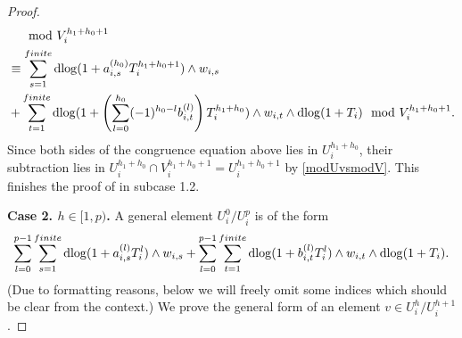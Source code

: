 \documentclass[11pt]{amsart}
\newcommand{\eq}[2]{\begin{equation}\label{#1}#2 \end{equation}}
\newcommand{\dlog}{\operatorname{dlog}}
\theoremstyle{plain}
\theoremstyle{definition}
\numberwithin{equation}{prop}
\begin{document}
\begin{proof}
\begin{align*}
&\quad
\mod V_i^{h_1+h_0+1}
\\
&\equiv 
\sum_{s=1}^{\rm finite}
\dlog(1+a^{(h_0)}_{i,s}T_i^{h_1+h_0+1})\wedge w_{i,s}
\\
&+\sum_{t=1}^{\rm finite}
\dlog(1+
\left(\sum_{l=0}^{h_0} (-1)^{h_0-l}b_{i,t}^{(l)}\right)
T_i^{h_1+h_0})\wedge w_{i,t}\wedge \dlog (1+T_i)
\mod V_i^{h_1+h_0+1}.
\end{align*}
Since both sides of the congruence equation above lies in $U_i^{h_1+h_0}$, their subtraction lies in $U_i^{h_1+h_0}\cap V_i^{h_1+h_0+1}=U_i^{h_1+h_0+1}$ by \eqref{modUvsmodV}.
This finishes the proof of  in subcase 1.2.





\textbf{Case 2. $h\in [1,p)$.}
A general element $U^{0}_i/U_i^{p}$ is of the form
\eq{genformv(1)}{
\sum_{l=0}^{p-1}\sum_{s=1}^{\rm finite}
\dlog(1+a^{(l)}_{i,s}T_i^{l})\wedge w_{i,s}
+\sum_{l=0}^{p-1}\sum_{t=1}^{\rm finite}
\dlog(1+b^{(l)}_{i,t}T_i^{l})\wedge w_{i,t}\wedge \dlog (1+T_i).
}
(Due to formatting reasons, below we will freely omit some indices which should be clear from the context.)
We prove the general form of an element $v\in U^{h}_i/U_i^{h+1}$.


\end{proof}
\end{document}
